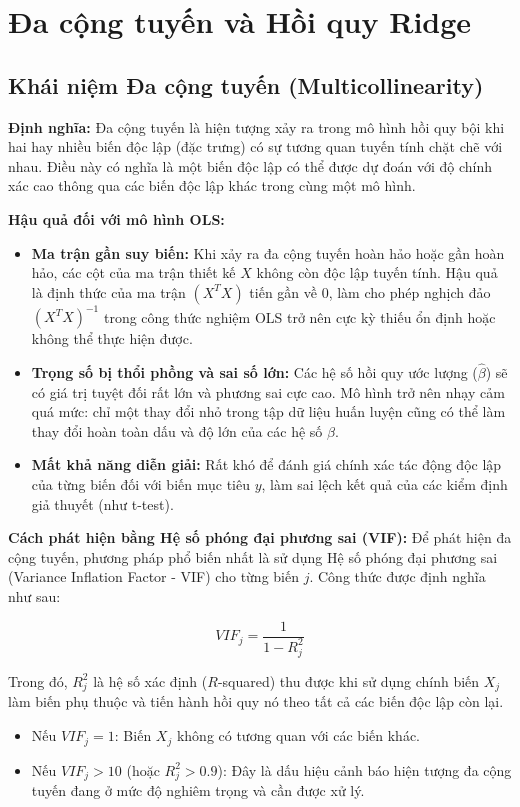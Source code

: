 \section{Đa cộng tuyến và Hồi quy Ridge}

\subsection{Khái niệm Đa cộng tuyến (Multicollinearity)}

\textbf{Định nghĩa:} Đa cộng tuyến là hiện tượng xảy ra trong mô hình hồi quy bội khi hai hay nhiều biến độc lập (đặc trưng) có sự tương quan tuyến tính chặt chẽ với nhau. Điều này có nghĩa là một biến độc lập có thể được dự đoán với độ chính xác cao thông qua các biến độc lập khác trong cùng một mô hình.

\textbf{Hậu quả đối với mô hình OLS:}
\begin{itemize}
    \item \textbf{Ma trận gần suy biến:} Khi xảy ra đa cộng tuyến hoàn hảo hoặc gần hoàn hảo, các cột của ma trận thiết kế $X$ không còn độc lập tuyến tính. Hậu quả là định thức của ma trận $(X^T X)$ tiến gần về 0, làm cho phép nghịch đảo $(X^T X)^{-1}$ trong công thức nghiệm OLS trở nên cực kỳ thiếu ổn định hoặc không thể thực hiện được.
    \item \textbf{Trọng số bị thổi phồng và sai số lớn:} Các hệ số hồi quy ước lượng ($\hat{\beta}$) sẽ có giá trị tuyệt đối rất lớn và phương sai cực cao. Mô hình trở nên nhạy cảm quá mức: chỉ một thay đổi nhỏ trong tập dữ liệu huấn luyện cũng có thể làm thay đổi hoàn toàn dấu và độ lớn của các hệ số $\beta$.
    \item \textbf{Mất khả năng diễn giải:} Rất khó để đánh giá chính xác tác động độc lập của từng biến đối với biến mục tiêu $y$, làm sai lệch kết quả của các kiểm định giả thuyết (như t-test).
\end{itemize}

\textbf{Cách phát hiện bằng Hệ số phóng đại phương sai (VIF):}
Để phát hiện đa cộng tuyến, phương pháp phổ biến nhất là sử dụng Hệ số phóng đại phương sai (Variance Inflation Factor - VIF) cho từng biến $j$. Công thức được định nghĩa như sau:

\begin{equation}
    VIF_j = \frac{1}{1 - R_j^2}
\end{equation}

Trong đó, $R_j^2$ là hệ số xác định ($R$-squared) thu được khi sử dụng chính biến $X_j$ làm biến phụ thuộc và tiến hành hồi quy nó theo tất cả các biến độc lập còn lại. 
\begin{itemize}
    \item Nếu $VIF_j = 1$: Biến $X_j$ không có tương quan với các biến khác.
    \item Nếu $VIF_j > 10$ (hoặc $R_j^2 > 0.9$): Đây là dấu hiệu cảnh báo hiện tượng đa cộng tuyến đang ở mức độ nghiêm trọng và cần được xử lý.
\end{itemize}

